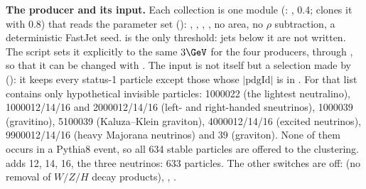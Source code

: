 \textbf{The producer and its input.} Each collection is one  module
(:  ,  0.4;
 clones it with  0.8) that reads the parameter set
 ():  ,
 ,  ,  , no area, no $\rho$ subtraction, a
deterministic FastJet seed.  is the only threshold: jets below it are not written. The script
sets it explicitly to the same $3\GeV$ for the four producers, through , so that it
can be changed with . The input is not  itself but a selection made by
 (): it keeps
every status-1 particle except those whose $|\mathrm{pdgId}|$ is in . For
 that list contains only hypothetical invisible particles: 1000022 (the lightest
neutralino), 1000012/14/16 and 2000012/14/16 (left- and right-handed sneutrinos), 1000039 (gravitino),
5100039 (Kaluza--Klein graviton), 4000012/14/16 (excited neutrinos), 9900012/14/16 (heavy Majorana
neutrinos) and 39 (graviton). None of them occurs in a Pythia8 \bbbar{} event, so all 634 stable particles
are offered to the clustering.  adds 12, 14, 16, the three neutrinos: 633
particles. The other switches are off:  (no removal of $W/Z/H$ decay
products), , .

